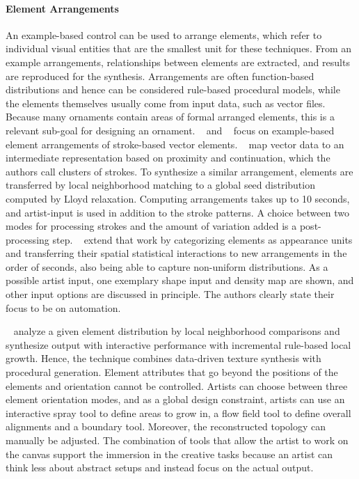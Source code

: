 \paragraph{Element Arrangements}
\label{para:analysis_example_based_arrangements}

An example-based control can be used to arrange elements, which refer to individual visual entities that are the smallest unit for these techniques. From an example arrangements, relationships between elements are extracted, and results are reproduced for the synthesis. Arrangements are often function-based distributions and hence can be considered rule-based procedural models, while the elements themselves usually come from input data, such as vector files. Because many ornaments contain areas of formal arranged elements, this is a relevant sub-goal for designing an ornament.
 \citeauthor*{barla_2006_spa}~\cite{barla_2006_spa} and \citeauthor*{hurtut_2009_ags}~\cite{hurtut_2009_ags} focus on example-based element arrangements of stroke-based vector elements. \citeauthor*{barla_2006_spa}~\cite{barla_2006_spa} map vector data to an intermediate representation based on proximity and continuation, which the authors call clusters of strokes. To synthesize a similar arrangement, elements are transferred by local neighborhood matching to a global seed distribution computed by Lloyd relaxation. Computing arrangements takes up to 10 seconds, and artist-input is used in addition to the stroke patterns. A choice between two modes for processing strokes and the amount of variation added is a post-processing step. \citeauthor*{hurtut_2009_ags}~\cite{hurtut_2009_ags} extend that work by categorizing elements as appearance units and transferring their spatial statistical interactions to new arrangements in the order of seconds, also being able to capture non-uniform distributions. As a possible artist input, one exemplary shape input and density map are shown, and other input options are discussed in principle. The authors clearly state their focus to be on automation.

 \citeauthor*{ijiri_2008_aeb}~\cite{ijiri_2008_aeb} analyze a given element distribution by local neighborhood comparisons and synthesize output with interactive performance with incremental rule-based local growth. Hence, the technique combines data-driven texture synthesis with procedural generation. Element attributes that go beyond the positions of the elements and orientation cannot be controlled. Artists can choose between three element orientation modes, and as a global design constraint, artists can use an interactive spray tool to define areas to grow in, a flow field tool to define overall alignments and a boundary tool. Moreover, the reconstructed topology can manually be adjusted. The combination of tools that allow the artist to work on the canvas support the immersion in the creative tasks because an artist can think less about abstract setups and instead focus on the actual output.


